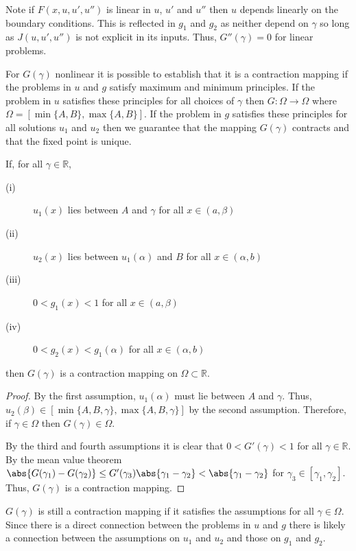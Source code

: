 \documentclass{book}
\begin{document}
Note if $F(x,u,u',u'')$ is linear in $u$, $u'$ and $u''$ then $u$ depends linearly on the boundary conditions.
This is reflected in $g_1$ and $g_2$ as neither depend on $\gamma$ so long as $J(u,u',u'')$ is not explicit in its inputs.
Thus, $G''(\gamma) = 0$ for linear problems.

For $G(\gamma)$ nonlinear it is possible to establish that it is a contraction mapping if the problems in $u$ and $g$ satisfy maximum and minimum principles.
If the problem in $u$ satisfies these principles for all choices of $\gamma$ then $G:\Omega \rightarrow \Omega$ where $\Omega = [ \min \{A,B\}, \max \{A,B\} ]$.
If the problem in $g$ satisfies these principles for all solutions $u_1$ and $u_2$ then we guarantee that the mapping $G(\gamma)$ contracts and that the fixed point is unique.

\begin{lemma}
If, for all $\gamma \in \mathbb{R}$, 
\begin{description}
\item[(i)] $u_1(x)$ lies between $A$ and $\gamma$ for all $x \in (a,\beta)$
\item[(ii)] $u_2(x)$ lies between $u_1(\alpha)$ and $B$ for all $x \in (\alpha, b)$
\item[(iii)] $0<g_1(x)<1$ for all $x \in (a,\beta)$
\item[(iv)] $0<g_2(x)<g_1(\alpha)$ for all $x \in (\alpha,b)$
\end{description}
then $G(\gamma)$ is a contraction mapping on $\Omega \subset \mathbb{R}$.
\end{lemma}

\begin{proof}
By the first assumption, $u_1(\alpha)$ must lie between $A$ and $\gamma$.
Thus, $u_2(\beta) \in [ \min \{A,B,\gamma\}, \max \{A,B, \gamma\} ]$ by the second assumption.
Therefore, if $\gamma \in \Omega$ then $G(\gamma) \in \Omega$.

By the third and fourth assumptions it is clear that $0 < G'(\gamma) < 1$ for all $\gamma \in \mathbb{R}$.
By the mean value theorem $\abs{G(\gamma_1) - G(\gamma_2)} \leq G'(\gamma_3) \abs{\gamma_1 - \gamma_2} < \abs{\gamma_1 - \gamma_2}$ for $\gamma_3 \in [\gamma_1, \gamma_2]$.
Thus, $G(\gamma)$ is a contraction mapping.
\end{proof}

$G(\gamma)$ is still a contraction mapping if it satisfies the assumptions for all $\gamma \in \Omega$.
Since there is a direct connection between the problems in $u$ and $g$ there is likely a connection between the assumptions on $u_1$ and $u_2$ and those on $g_1$ and $g_2$.
\end{document}
